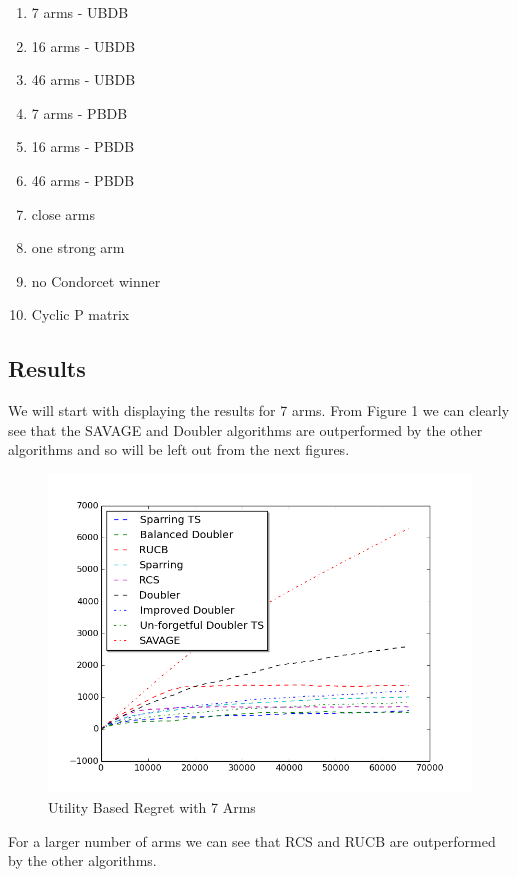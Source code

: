\documentclass{llncs}
\begin{document}
\begin{enumerate}

\item 7 arms - UBDB
\item 16 arms - UBDB
\item 46 arms - UBDB
\item 7 arms - PBDB
\item 16 arms - PBDB
\item 46 arms - PBDB
\item close arms
\item one strong arm
\item no Condorcet winner
\item Cyclic P matrix

\end{enumerate}

\newpage

\subsection{Results}
We will start with displaying the results for 7 arms.
From Figure 1 we can clearly see that the SAVAGE and Doubler algorithms are outperformed by the other algorithms and so will be left out from the next figures.
\begin{figure}[h!]
\centering
  \includegraphics[scale=0.5, natwidth=610,natheight=642]{figures/all_MQ2007_7arms.png}
  \caption{Utility Based Regret with 7 Arms}
\end{figure}

For a larger number of arms we can see that RCS and RUCB are outperformed by the other algorithms.
\end{document}
